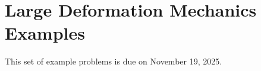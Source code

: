\section{Large Deformation Mechanics Examples}
\label{PS3}

This set of example problems is due on November 19, 2025. 

